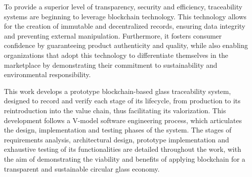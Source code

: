 To provide a superior level of transparency, security and efficiency, traceability systems are beginning to leverage blockchain technology. This technology allows for the creation of immutable and decentralized records, ensuring data integrity and preventing external manipulation. Furthermore, it fosters consumer confidence by guaranteeing product authenticity and quality, while also enabling organizations that adopt this technology to differentiate themselves in the marketplace by demonstrating their commitment to sustainability and environmental responsibility.

This work develops a prototype blockchain-based glass traceability system, designed to record and verify each stage of its lifecycle, from production to its reintroduction into the value chain, thus facilitating its valorization. This development follows a V-model software engineering process, which articulates the design, implementation and testing phases of the system. The stages of requirements analysis, architectural design, prototype implementation and exhaustive testing of its functionalities are detailed throughout the work, with the aim of demonstrating the viability and benefits of applying blockchain for a transparent and sustainable circular glass economy.
